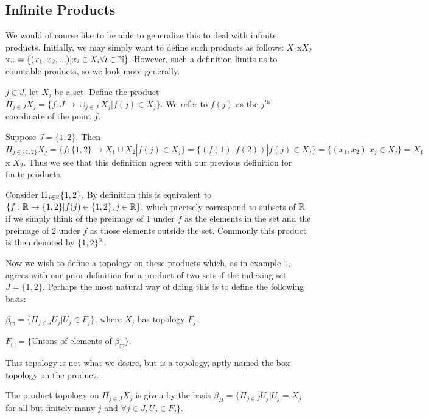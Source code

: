 \subsection{Infinite Products} We would of course like to be able to generalize this to deal with infinite products. Initially, we may simply want to define such products as follows: $X_1$x$X_2$x...$=\{(x_1,x_2,...)|x_i \in X_i \forall i \in \mathbb N \}$. However, such a definition limits us to countable products, so we look more generally.
\begin{definition}
	$j \in J$, let $X_j$ be a set. Define the product $\Pi_{j \in J} X_j = \{f:J \rightarrow \cup_{j \in J}X_j|f(j) \in X_j\}.$ We refer to $f(j)$ as the $j^{th}$ coordinate of the point $f$. 
\end{definition}
\begin{example}
	Suppose $J = \{1,2\}$. Then $\Pi_{j\in \{1,2\}}X_j = \{f: \{1,2\} \rightarrow X_1\cup X_2|f(j) \in X_j\} = \{(f(1),f(2))|f(j) \in X_j\}=\{(x_1,x_2)|x_j \in X_j\} = X_1$ x $X_2.$ Thus we see that this definition agrees with our previous definition for finite products. 
\end{example}
\begin{example}
	Consider $\Pi_{j \in \mathbb R}\{1,2\}$. By definition this is equivalent to $\{f: \mathbb R \rightarrow \{1,2\}| f(j) \in \{1,2\}, j \in \mathbb R\}$, which precisely correspond to subsets of $\mathbb R$ if we simply think of the preimage of $1$ under $f$ as the elements in the set and the preimage of $2$ under $f$ as those elements outside the set. Commonly this product is then denoted by $\{1,2\}^{\mathbb R}$. 
\end{example}

Now we wish to define a topology on these products which, as in example $1$, agrees with our prior definition for a product of two sets if the indexing set $J = \{1,2\}$. Perhaps the most natural way of doing this is to define the following basis: 
\begin{center}
	$\beta_{\Box} = \{\Pi_{j \in J} U_j|U_j \in F_j\}$, where $X_j$ has topology $F_j$.
	
	$F_{\Box} = \{$Unions of elements of $\beta_{\Box}\}.$ 
\end{center}
This topology is not what we desire, but is a topology, aptly named the box topology on the product.
\begin{example}
	The product topology on $\Pi_{j \in J}X_j$ is given by the basis $\beta_{\Pi} = \{\Pi_{j \in J}U_j|U_j = X_j$ for all but finitely many $j$ and $\forall j \in J, U_j \in F_j \}$. 
\end{example}

